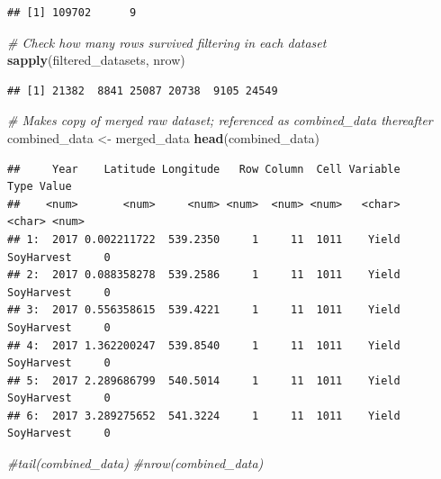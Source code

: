 \documentclass[
]{article}
\newenvironment{Shaded}{\begin{snugshade}}{\end{snugshade}}
\newcommand{\CommentTok}[1]{\textcolor[rgb]{0.56,0.35,0.01}{\textit{#1}}}
\newcommand{\FunctionTok}[1]{\textcolor[rgb]{0.13,0.29,0.53}{\textbf{#1}}}
\newcommand{\NormalTok}[1]{#1}
\newcommand{\OtherTok}[1]{\textcolor[rgb]{0.56,0.35,0.01}{#1}}
\begin{document}
\begin{verbatim}
## [1] 109702      9
\end{verbatim}

\begin{Shaded}
\end{Shaded}

\begin{Shaded}
\begin{Highlighting}[]
\CommentTok{\# Check how many rows survived filtering in each dataset}
\FunctionTok{sapply}\NormalTok{(filtered\_datasets, nrow)}
\end{Highlighting}
\end{Shaded}

\begin{verbatim}
## [1] 21382  8841 25087 20738  9105 24549
\end{verbatim}

\begin{Shaded}
\begin{Highlighting}[]
\CommentTok{\# Makes copy of merged raw dataset; referenced as combined\_data thereafter}
\NormalTok{combined\_data }\OtherTok{\textless{}{-}}\NormalTok{ merged\_data}
\FunctionTok{head}\NormalTok{(combined\_data)}
\end{Highlighting}
\end{Shaded}

\begin{verbatim}
##     Year    Latitude Longitude   Row Column  Cell Variable       Type Value
##    <num>       <num>     <num> <num>  <num> <num>   <char>     <char> <num>
## 1:  2017 0.002211722  539.2350     1     11  1011    Yield SoyHarvest     0
## 2:  2017 0.088358278  539.2586     1     11  1011    Yield SoyHarvest     0
## 3:  2017 0.556358615  539.4221     1     11  1011    Yield SoyHarvest     0
## 4:  2017 1.362200247  539.8540     1     11  1011    Yield SoyHarvest     0
## 5:  2017 2.289686799  540.5014     1     11  1011    Yield SoyHarvest     0
## 6:  2017 3.289275652  541.3224     1     11  1011    Yield SoyHarvest     0
\end{verbatim}

\begin{Shaded}
\begin{Highlighting}[]
\CommentTok{\#tail(combined\_data)}
\CommentTok{\#nrow(combined\_data)}
\end{Highlighting}
\end{Shaded}
\end{document}
